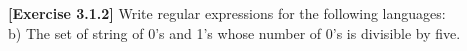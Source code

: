 \textbf{[Exercise 3.1.2]} Write regular expressions for the following languages:\\
b) The set of string of 0's and 1's whose number of 0's is divisible by five.
